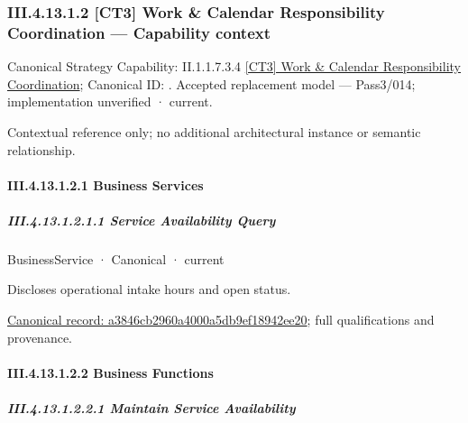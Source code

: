 \subsubsection*{III.4.13.1.2 [CT3] Work \& Calendar Responsibility Coordination — Capability context}
\label{navigation:III.4.13.1.2}

{\small Canonical Strategy Capability: II.1.1.7.3.4 \hyperref[element:8ead6499039b4a9ea14beeae7d0ff6f4]{[CT3] Work \& Calendar Responsibility Coordination}; Canonical ID: \texttt{}. Accepted replacement model — Pass3/014; implementation unverified · current.}\par
Contextual reference only; no additional architectural instance or semantic relationship.\par
\paragraph*{III.4.13.1.2.1 Business Services}
\label{navigation:III.4.13.1.2.1}

\subparagraph*{III.4.13.1.2.1.1 Service Availability Query}
\label{navigation:III.4.13.1.2.1.1}

\label{element:a3846cb2960a4000a5db9ef18942ee20}
{\small BusinessService · Canonical · current}\par

Discloses operational intake hours and open status.


{\footnotesize \href{../../../../../../../continuum/business/business-service/a3846cb2960a4000a5db9ef18942ee20.md}{Canonical record: a3846cb2960a4000a5db9ef18942ee20}; full qualifications and provenance.}\par
\paragraph*{III.4.13.1.2.2 Business Functions}
\label{navigation:III.4.13.1.2.2}

\subparagraph*{III.4.13.1.2.2.1 Maintain Service Availability}
\label{navigation:III.4.13.1.2.2.1}


